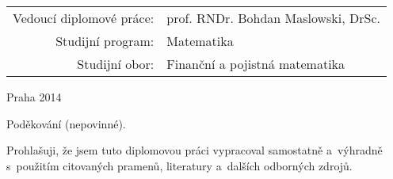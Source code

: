 \begin{center}
\begin{tabular}{rl}
Vedoucí diplomové práce: & prof. RNDr. Bohdan Maslowski, DrSc. \\   %
\noalign{\vspace{2mm}}
Studijní program: & Matematika\\
\noalign{\vspace{2mm}}
Studijní obor: & Finanční a pojistná matematika\\
\end{tabular}

\vfill

Praha 2014

\end{center}







\newpage
\openright

\noindent
Poděkování (nepovinné).




\newpage

\noindent
Prohlašuji, že jsem tuto diplomovou práci vypracoval samostatně a~výhradně
s~použitím citovaných pramenů, literatury a~dalších odborných zdrojů.

